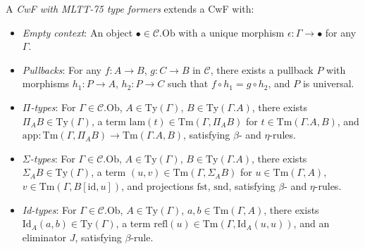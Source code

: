 \documentclass{article}
\begin{document}
\begin{definition}
A \emph{CwF with MLTT-75 type formers} extends a CwF with:
\begin{itemize}
  \item \emph{Empty context}: An object $\bullet \in \mathcal{C}.\text{Ob}$ with a unique morphism $\epsilon : \Gamma \to \bullet$ for any $\Gamma$.
  \item \emph{Pullbacks}: For any $f : A \to B$, $g : C \to B$ in $\mathcal{C}$, there exists a pullback $P$ with morphisms $h_1 : P \to A$, $h_2 : P \to C$ such that $f \circ h_1 = g \circ h_2$, and $P$ is universal.
  \item \emph{$\Pi$-types}: For $\Gamma \in \mathcal{C}.\text{Ob}$, $A \in \text{Ty}(\Gamma)$, $B \in \text{Ty}(\Gamma.A)$, there exists $\Pi_A B \in \text{Ty}(\Gamma)$, a term $\text{lam}(t) \in \text{Tm}(\Gamma, \Pi_A B)$ for $t \in \text{Tm}(\Gamma.A, B)$, and $\text{app} : \text{Tm}(\Gamma, \Pi_A B) \to \text{Tm}(\Gamma.A, B)$, satisfying $\beta$- and $\eta$-rules.
  \item \emph{$\Sigma$-types}: For $\Gamma \in \mathcal{C}.\text{Ob}$, $A \in \text{Ty}(\Gamma)$, $B \in \text{Ty}(\Gamma.A)$, there exists $\Sigma_A B \in \text{Ty}(\Gamma)$, a term $(u, v) \in \text{Tm}(\Gamma, \Sigma_A B)$ for $u \in \text{Tm}(\Gamma, A)$, $v \in \text{Tm}(\Gamma, B[\text{id}, u])$, and projections $\text{fst}$, $\text{snd}$, satisfying $\beta$- and $\eta$-rules.
  \item \emph{Id-types}: For $\Gamma \in \mathcal{C}.\text{Ob}$, $A \in \text{Ty}(\Gamma)$, $a, b \in \text{Tm}(\Gamma, A)$, there exists $\text{Id}_A(a, b) \in \text{Ty}(\Gamma)$, a term $\text{refl}(u) \in \text{Tm}(\Gamma, \text{Id}_A(u, u))$, and an eliminator $J$, satisfying $\beta$-rule.
\end{itemize}
\end{definition}
\end{document}
